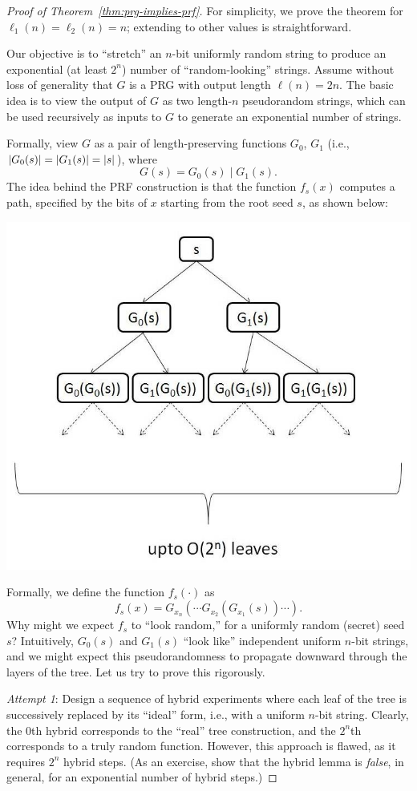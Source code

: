 \documentclass[11pt]{article}
\begin{document}
\begin{proof}[Proof of Theorem~\ref{thm:prg-implies-prf}]
  For simplicity, we prove the theorem for $\ell_{1}(n) = \ell_{2}(n)
  = n$; extending to other values is straightforward.

  Our objective is to ``stretch'' an $n$-bit uniformly random string
  to produce an exponential (at least $2^{n}$) number of
  ``random-looking'' strings.  Assume without loss of generality that
  $G$ is a PRG with output length $\ell(n) = 2n$.  The basic idea is
  to view the output of $G$ as two length-$n$ pseudorandom strings,
  which can be used recursively as inputs to $G$ to generate an
  exponential number of strings.

  Formally, view $G$ as a pair of length-preserving functions $G_{0}$,
  $G_{1}$ (i.e., $\lvert G_{0}(s)\rvert = \lvert G_{1}(s)\rvert = \lvert s\rvert$), where
  \[ G(s) = G_{0}(s) \mid G_{1}(s). \] The idea behind the PRF
  construction is that the function $f_{s}(x)$ computes a path,
  specified by the bits of $x$ starting from the root seed $s$, as
  shown below:
  \begin{center}
    \includegraphics[width=.6\linewidth]{PRF.jpg}
  \end{center}

  Formally, we define the function $f_{s}(\cdot)$ as
  \[f_{s}(x) = G_{x_{n}}(\cdots G_{x_{2}}(G_{x_{1}}(s)) \cdots). \]
  Why might we expect $f_{s}$ to ``look random,'' for a uniformly
  random (secret) seed $s$?  Intuitively, $G_{0}(s)$ and $G_{1}(s)$
  ``look like'' independent uniform $n$-bit strings, and we might
  expect this pseudorandomness to propagate downward through the
  layers of the tree.  Let us try to prove this rigorously.

  \emph{Attempt 1}: Design a sequence of hybrid experiments where each
  leaf of the tree is successively replaced by its ``ideal'' form,
  i.e., with a uniform $n$-bit string.  Clearly, the $0$th hybrid
  corresponds to the ``real'' tree construction, and the $2^{n}$th
  corresponds to a truly random function.  However, this approach is
  flawed, as it requires $2^n$ hybrid steps.  (As an exercise, show
  that the hybrid lemma is \emph{false}, in general, for an
  exponential number of hybrid steps.)


\end{proof}
\end{document}
